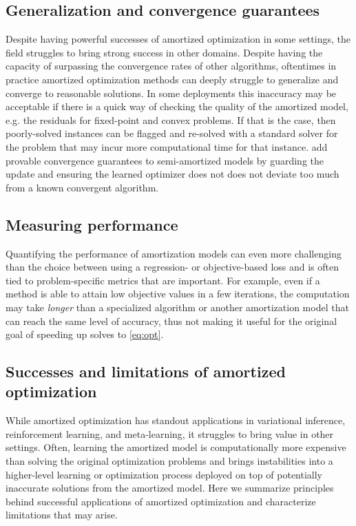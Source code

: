 \documentclass[twoside,11pt]{article}
\newcommand{\eg}{e.g.\xspace}
\begin{document}
\subsection{Generalization and convergence guarantees}
\label{sec:generalization}
Despite having powerful successes of amortized optimization in
some settings, the field struggles to bring strong success
in other domains.
Despite having the capacity of surpassing the convergence rates of
other algorithms, oftentimes in practice amortized optimization
methods can deeply struggle to generalize and converge to
reasonable solutions.
In some deployments this inaccuracy may be acceptable if there
is a quick way of checking the quality of the amortized model,
\eg the residuals for fixed-point and convex problems.
If that is the case, then poorly-solved instances can be flagged
and re-solved with a standard solver for the problem that
may incur more computational time for that instance.
\citet{banert2021accelerated,premont2022simple} add provable
convergence guarantees to semi-amortized models by guarding
the update and ensuring the learned optimizer does not
does not deviate too much from a known convergent algorithm.

\subsection{Measuring performance}
Quantifying the performance of amortization models can even more
challenging than the choice between using a regression- or
objective-based loss and is often tied to
problem-specific metrics that are important.
For example, even if a method is able to attain low objective values
in a few iterations, the computation may take \emph{longer} than
a specialized algorithm or another amortization model that can reach
the same level of accuracy, thus not making it useful for the
original goal of speeding up solves to \cref{eq:opt}.

\subsection{Successes and limitations of amortized optimization}
While amortized optimization has standout applications in
variational inference, reinforcement learning, and meta-learning,
it struggles to bring value in other settings.
Often, learning the amortized model is computationally more
expensive than solving the original optimization problems and
brings instabilities into a higher-level learning or optimization
process deployed on top of potentially inaccurate solutions
from the amortized model.
Here we summarize principles behind successful applications
of amortized optimization and characterize limitations that
may arise.
\end{document}
